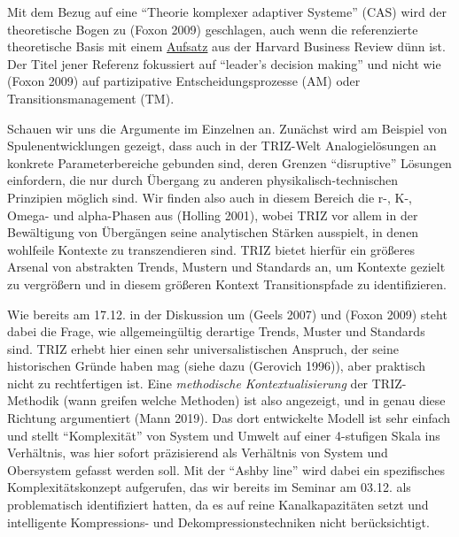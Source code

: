 \documentclass[11pt,a4paper]{article}
\begin{document}
Mit dem Bezug auf eine ``Theorie komplexer adaptiver Systeme'' (CAS)
wird der theoretische Bogen zu (Foxon 2009) geschlagen, auch wenn die
referenzierte theoretische Basis mit einem
\href{https://hbr.org/2007/11/a-leaders-framework-for-decision-making}{Aufsatz}
aus der Harvard Business Review dünn ist. Der Titel jener Referenz
fokussiert auf ``leader's decision making'' und nicht wie (Foxon 2009)
auf partizipative Entscheidungsprozesse (AM) oder Transitionsmanagement
(TM).

Schauen wir uns die Argumente im Einzelnen an. Zunächst wird am Beispiel
von Spulenentwicklungen gezeigt, dass auch in der TRIZ-Welt
Analogielösungen an konkrete Parameterbereiche gebunden sind, deren
Grenzen ``disruptive'' Lösungen einfordern, die nur durch Übergang zu
anderen physikalisch-technischen Prinzipien möglich sind. Wir finden
also auch in diesem Bereich die r-, K-, Omega- und alpha-Phasen aus
(Holling 2001), wobei TRIZ vor allem in der Bewältigung von Übergängen
seine analytischen Stärken ausspielt, in denen wohlfeile Kontexte zu
transzendieren sind. TRIZ bietet hierfür ein größeres Arsenal von
abstrakten Trends, Mustern und Standards an, um Kontexte gezielt zu
vergrößern und in diesem größeren Kontext Transitionspfade zu
identifizieren.

Wie bereits am 17.12. in der Diskussion um (Geels 2007) und (Foxon 2009)
steht dabei die Frage, wie allgemeingültig derartige Trends, Muster und
Standards sind. TRIZ erhebt hier einen sehr universalistischen Anspruch,
der seine historischen Gründe haben mag (siehe dazu (Gerovich 1996)),
aber praktisch nicht zu rechtfertigen ist. Eine \emph{methodische
Kontextualisierung} der TRIZ-Methodik (wann greifen welche Methoden) ist
also angezeigt, und in genau diese Richtung argumentiert (Mann 2019).
Das dort entwickelte Modell ist sehr einfach und stellt ``Komplexität''
von System und Umwelt auf einer 4-stufigen Skala ins Verhältnis, was
hier sofort präzisierend als Verhältnis von System und Obersystem
gefasst werden soll. Mit der ``Ashby line'' wird dabei ein spezifisches
Komplexitätskonzept aufgerufen, das wir bereits im Seminar am 03.12. als
problematisch identifiziert hatten, da es auf reine Kanalkapazitäten
setzt und intelligente Kompressions- und Dekompressionstechniken nicht
berücksichtigt.
\end{document}
